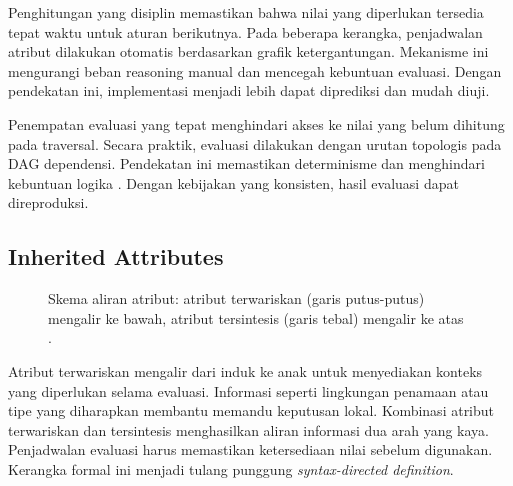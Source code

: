\documentclass[../main.tex]{subfiles}
\begin{document}
Penghitungan yang disiplin memastikan bahwa nilai yang diperlukan tersedia tepat waktu untuk aturan berikutnya. Pada beberapa kerangka, penjadwalan atribut dilakukan otomatis berdasarkan grafik ketergantungan. Mekanisme ini mengurangi beban reasoning manual dan mencegah kebuntuan evaluasi. Dengan pendekatan ini, implementasi menjadi lebih dapat diprediksi dan mudah diuji.

Penempatan evaluasi yang tepat menghindari akses ke nilai yang belum dihitung pada traversal. Secara praktik, evaluasi dilakukan dengan urutan topologis pada DAG dependensi. Pendekatan ini memastikan determinisme dan menghindari kebuntuan logika \citep{WikiAttributeGrammar}. Dengan kebijakan yang konsisten, hasil evaluasi dapat direproduksi.

\subsection{Inherited Attributes}
\begin{figure}[t]
  \centering
  \caption{Skema aliran atribut: atribut terwariskan (garis putus-putus) mengalir ke bawah, atribut tersintesis (garis tebal) mengalir ke atas \citep{WikiAttributeGrammar,WikiSDT}.}
  \label{fig:attr-flow}
\end{figure}
Atribut terwariskan mengalir dari induk ke anak untuk menyediakan konteks yang diperlukan selama evaluasi. Informasi seperti lingkungan penamaan atau tipe yang diharapkan membantu memandu keputusan lokal. Kombinasi atribut terwariskan dan tersintesis menghasilkan aliran informasi dua arah yang kaya. Penjadwalan evaluasi harus memastikan ketersediaan nilai sebelum digunakan. Kerangka formal ini menjadi tulang punggung \emph{syntax-directed definition}.
\end{document}
